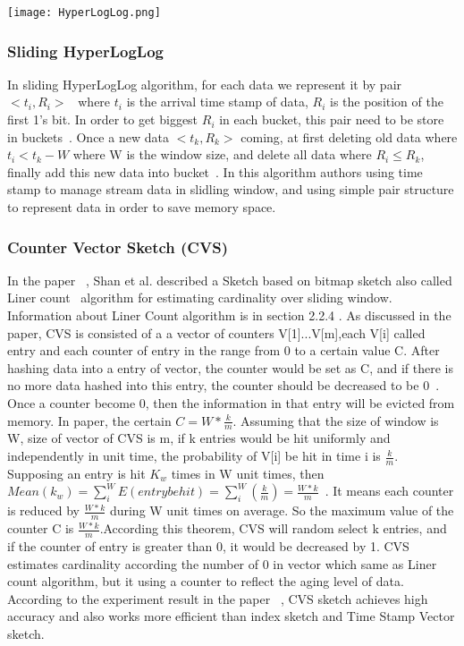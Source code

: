 \documentclass{report}
\begin{document}
\texttt{[image: HyperLogLog.png]}

\subsubsection{Sliding HyperLogLog}
In sliding HyperLogLog algorithm, for each data we represent it by pair $<t_i, R_i>$~\cite{chabchoub2010sliding} where $t_i$ is the arrival time stamp of data, $R_i$ is the position of the first 1's bit. In order to get biggest $R_i$ in each bucket, this pair need to be store in buckets~\cite{chabchoub2010sliding}. Once a new data $<t_k, R_k>$ coming, at first deleting old data where $t_i < t_k - W$ where W is the window size, and delete all data where $R_i \leq R_k$, finally add this new data into bucket~\cite{chabchoub2010sliding}. In this algorithm authors using time stamp to manage stream data in slidling window, and using simple pair structure to represent data in order to save memory space. 

\subsubsection{Counter Vector Sketch (CVS)}
In the paper ~\cite{shan2016cvs}, Shan et al. described a Sketch based on bitmap sketch also called Liner count~\cite{shan2016cvs} algorithm for estimating cardinality over sliding window. Information about Liner Count algorithm is in section 2.2.4 . As discussed in the paper, CVS is consisted of a a vector of counters V[1]...V[m],each V[i] called entry and each counter of entry in the range from 0 to a certain value C. After hashing data into a entry of vector, the counter would be set as C, and if there is no more data hashed into this entry, the counter should be decreased to be 0~\cite{shan2016cvs}. Once a counter become 0, then the information in that entry will be evicted from memory.
In paper, the certain $C = W*\frac{k}{m}$. Assuming that the size of window is W, size of vector of CVS is m, if k entries would be hit uniformly and independently in unit time, the probability of V[i] be hit in time i is $\frac{k}{m}$. Supposing an entry is hit $K_w$ times in W unit times, then $Mean(k_w) = \sum_{i}^{W}E(entry be hit) = \sum_{i}^{W}(\frac{k}{m}) = \frac{W*k}{m}$~\cite{shan2016cvs}. It means each counter is reduced by $\frac{W*k}{m}$ during W unit times on average. So the maximum value of the counter C is $\frac{W*k}{m}$.According this theorem, CVS will random select k entries, and if the counter of entry is greater than 0, it would be decreased by 1. CVS estimates cardinality according the number of 0 in vector which same as Liner count algorithm, but it using a counter to reflect the aging level of data. According to the experiment result in the paper ~\cite{shan2016cvs}, CVS sketch achieves high accuracy and also works more efficient than index sketch and Time Stamp Vector sketch.
\end{document}
